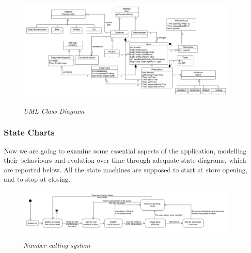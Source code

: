 \documentclass{article}
\begin{document}
		\begin{figure}
			\begin{adjustwidth}{-3cm}{}
				\centering
				\includegraphics[scale=0.38, angle=90, trim= 0 0 0 -5cm]{ClassDiagrams/classDiagram.pdf} \\
				\caption{\emph{UML Class Diagram}}
			\end{adjustwidth}
		\end{figure}
	
		\newpage
		
		\subsubsection{State Charts}
		
		Now we are going to examine some essential aspects of the application, modelling their behaviours and evolution over time through adequate state diagrams, which are reported below. All the state machines are supposed to start at store opening, and to stop at closing.
		
		\begin{figure}[!h]
			\centering
			\hspace*{-1.9cm}\includegraphics[scale=0.32]{StateCharts/number_calling_system.pdf} \\
			\caption{\emph{Number calling system}}
		\end{figure}
	
\end{document}

